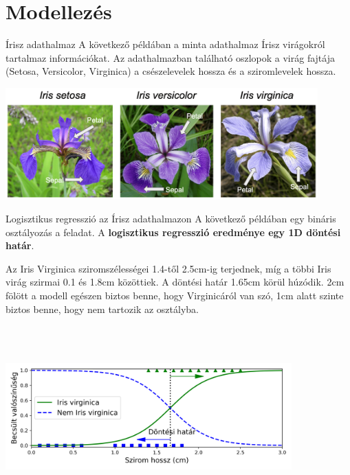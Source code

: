 \documentclass[english, aspectratio=169]{beamer}
\makeatletter
\let\origtableofcontents=\tableofcontents
\def\tableofcontents{\@ifnextchar[{\origtableofcontents}{\gobbletableofcontents}}
\def\gobbletableofcontents#1{\origtableofcontents}
\makeatother
\begin{document}
\section{Modellezés}

\begin{frame}
\tableofcontents[currentsection]
\end{frame}

\begin{frame}{Írisz adathalmaz}
A következő példában a minta adathalmaz Írisz virágokról tartalmaz információkat. Az adathalmazban található oszlopok a virág fajtája (Setosa, Versicolor, Virginica) a csészelevelek hossza és a sziromlevelek hossza. 
\begin{center}
\includegraphics[width=12cm, keepaspectratio]{images/osztalyozas_19.png}
\end{center}
\end{frame}

\begin{frame}{Logisztikus regresszió az Írisz adathalmazon}
A következő példában egy bináris osztályozás a feladat. A \textbf{logisztikus regresszió eredménye egy 1D döntési határ}.\par\smallskip
Az Iris Virginica sziromszélességei 1.4-től 2.5cm-ig terjednek, míg a többi Iris virág szirmai 0.1 és 1.8cm közöttiek. A döntési határ 1.65cm körül húzódik. 2cm fölött a modell egészen biztos benne, hogy Virginicáról van szó, 1cm alatt szinte biztos benne, hogy nem tartozik az osztályba.\par\smallskip
\begin{center}
\includegraphics[width=11cm, height=7cm, keepaspectratio]{images/osztalyozas_20.png}
\end{center}
\end{frame}
\end{document}
